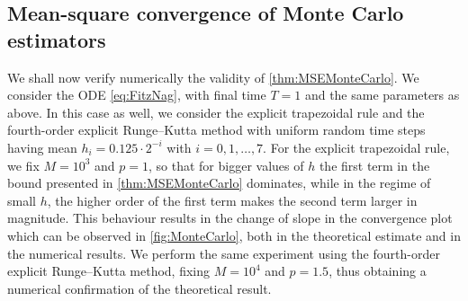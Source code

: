 \documentclass[10pt]{article}
\begin{document}
\subsection{Mean-square convergence of Monte Carlo estimators} 
We shall now verify numerically the validity of \cref{thm:MSEMonteCarlo}. We consider the ODE \eqref{eq:FitzNag}, with final time $T = 1$ and the same parameters as above. In this case as well, we consider the explicit trapezoidal rule and the fourth-order explicit Runge--Kutta method with uniform random time steps having mean $h_i = 0.125\cdot 2^{-i}$ with $i = 0, 1, \ldots, 7$. For the explicit trapezoidal rule, we fix $M = 10^3$ and $p = 1$, so that for bigger values of $h$ the first term in the bound presented in \cref{thm:MSEMonteCarlo} dominates, while in the regime of small $h$, the higher order of the first term makes the second term larger in magnitude. This behaviour results in the change of slope in the convergence plot which can be observed in \cref{fig:MonteCarlo}, both in the theoretical estimate and in the numerical results. We perform the same experiment using the fourth-order explicit Runge--Kutta method, fixing $M = 10^4$ and $p = 1.5$, thus obtaining a numerical confirmation of the theoretical result.

\end{document}
